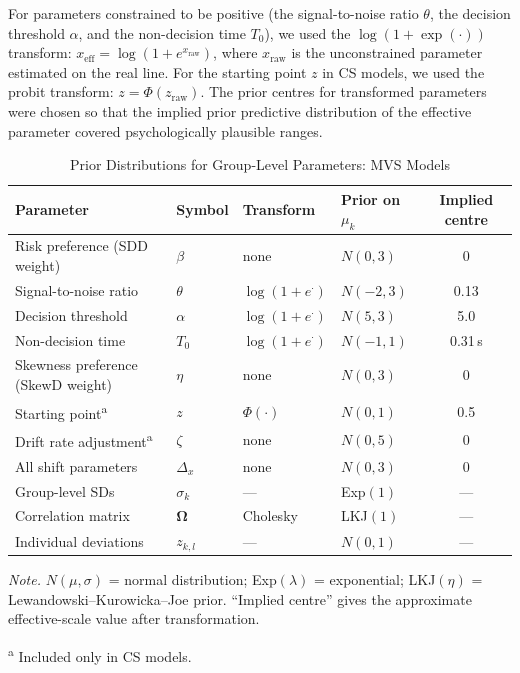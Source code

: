 \documentclass[man,floatsintext]{apa7}
\begin{document}
For parameters constrained to be positive (the signal-to-noise ratio $\theta$, the decision threshold $\alpha$, and the non-decision time $T_0$), we used the $\log(1+\exp(\cdot))$ transform: $x_{\text{eff}} = \log(1 + e^{x_{\text{raw}}})$, where $x_{\text{raw}}$ is the unconstrained parameter estimated on the real line. For the starting point $z$ in CS models, we used the probit transform: $z = \Phi(z_{\text{raw}})$. The prior centres for transformed parameters were chosen so that the implied prior predictive distribution of the effective parameter covered psychologically plausible ranges.

\begin{table}[!htbp]
\centering
\begin{threeparttable}
\caption{Prior Distributions for Group-Level Parameters: MVS Models}
\label{tab:priors_mvs}
\begin{tabular}{llllc}
\toprule
\textbf{Parameter} & \textbf{Symbol} & \textbf{Transform} & \textbf{Prior on $\mu_k$} & \textbf{Implied centre} \\
\midrule
Risk preference (SDD weight)  & $\beta$      & none                  & $N(0, 3)$   & 0 \\
Signal-to-noise ratio         & $\theta$     & $\log(1{+}e^{\cdot})$ & $N(-2, 3)$  & 0.13 \\
Decision threshold            & $\alpha$     & $\log(1{+}e^{\cdot})$ & $N(5, 3)$   & 5.0 \\
Non-decision time             & $T_0$        & $\log(1{+}e^{\cdot})$ & $N(-1, 1)$ & 0.31\,s \\
Skewness preference (SkewD weight) & $\eta$ & none                  & $N(0, 3)$   & 0 \\
Starting point\textsuperscript{a}  & $z$    & $\Phi(\cdot)$         & $N(0, 1)$   & 0.5 \\
Drift rate adjustment\textsuperscript{a} & $\zeta$ & none           & $N(0, 5)$   & 0 \\
All shift parameters          & $\Delta_x$   & none                  & $N(0, 3)$   & 0 \\
Group-level SDs               & $\sigma_k$   & ---                   & Exp$(1)$    & --- \\
Correlation matrix            & $\mathbf{\Omega}$ & Cholesky         & LKJ$(1)$    & --- \\
Individual deviations         & $z_{k,l}$    & ---                   & $N(0, 1)$   & --- \\
\bottomrule
\end{tabular}
\begin{tablenotes}[flushleft]
\small
\item \textit{Note.} $N(\mu, \sigma)$ = normal distribution; Exp$(\lambda)$ = exponential; LKJ$(\eta)$ = Lewandowski--Kurowicka--Joe prior. ``Implied centre'' gives the approximate effective-scale value after transformation.
\item \textsuperscript{a} Included only in CS models.
\end{tablenotes}
\end{threeparttable}
\end{table}
\end{document}
